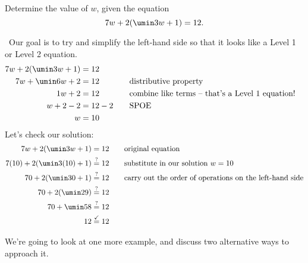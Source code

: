 \begin{boxedex}
\label{ex:dist}
Determine the value of $w$, given the equation \[7w + 2(\umin3w + 1) = 12.\]

\exsoln\ Our goal is to try and simplify the left-hand side so that it looks like a Level 1 or Level 2 equation.
\[\begin{aligned}
7w + 2(\umin3w + 1) &= 12\\
7w + \umin6w + 2 &= 12
&&\text{\quad distributive property}\\
1w + 2 & = 12
&&\text{\quad combine like terms -- that's a Level 1 equation!}\\
w + 2 - 2 & = 12 - 2
&&\text{\quad SPOE}\\
w & = 10
\end{aligned}\]
Let's check our solution:
\[\begin{aligned}
7w + 2(\umin3w + 1) &= 12
&& \text{\quad original equation}\\
7(10) + 2(\umin3(10) + 1) &\overset{?}{=} 12
&& \text{\quad substitute in our solution $w = 10$}\\
70 + 2(\umin30 + 1) &\overset{?}{=} 12
&& \text{\quad carry out the order of operations on the left-hand side}\\
70 + 2(\umin29) &\overset{?}{=} 12\\
70 + \umin58 &\overset{?}{=} 12\\
12 &\overset{\checkmark}{=} 12\\
\end{aligned}\]
\end{boxedex}

We're going to look at one more example, and discuss two alternative ways to approach it.

